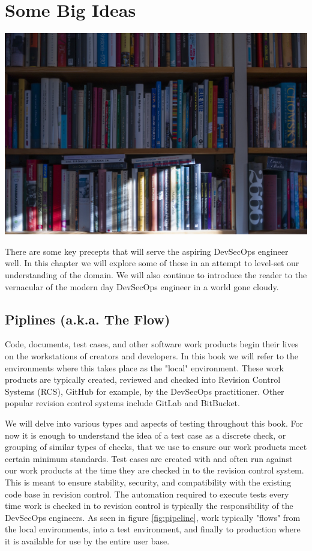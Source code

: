 \chapter{Some Big Ideas}

\includegraphics{../images/book-5104342_1920.jpg}

\justify
There are some key precepts that will serve the aspiring DevSecOps
engineer well. In this chapter we will explore some of these in
an attempt to level-set our understanding of the domain. We will also
continue to introduce the reader to the vernacular
of the modern day DevSecOps engineer in a world gone cloudy.

\section{Piplines (a.k.a. The Flow)}

\justify
Code, documents, test cases, and other software work products begin
their lives on the workstations of creators and developers. In this
book we will refer to the environments where this takes place as the
"local" environment. These work products are typically created, reviewed and
checked into Revision Control Systems (RCS), 
GitHub for example, by the DevSecOps practitioner. 
Other popular revision control systems include GitLab and 
BitBucket.

\justify
We will delve into various types and aspects of testing 
throughout this book. For now it is enough to understand the idea of
a test case as a discrete check, or grouping of similar types of 
checks, that we use to ensure our work products meet certain minimum
standards.  Test cases are created with and often run against our
work products at the time they are checked in to the revision control
system. This is meant to ensure stability, security, and compatibility
with the existing code base in revision control. The automation required 
to execute tests every time work is checked in to revision control is 
typically the responsibility of the DevSecOps engineers. As seen in 
figure \ref{fig:pipeline}, work typically "flows" from the local environments, 
into a test environment, and finally to production where it is available 
for use by the entire user base.

